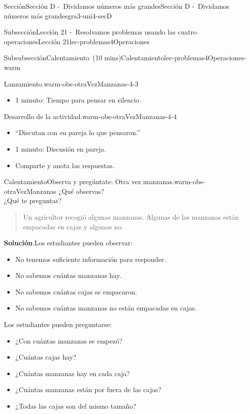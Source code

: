 \documentclass[oneside,10pt,]{article}
\newcommand{\blocktitlefont}{\relax}
\begin{document}
\begin{sectionptx}{Sección}{Sección D -~Dividamos números más grandes}{}{Sección D -~Dividamos números más grandes}{}{}{gra3-uni4-secD}
\begin{subsectionptx}{Subsección}{Lección 21 -~Resolvamos problemas usando las cuatro operaciones}{}{Lección 21}{}{}{lec-problemas4Operaciones}
\begin{subsubsectionptx}{Subsubsección}{Calentamiento~(10 mins)}{}{Calentamiento}{}{}{lec-problemas4Operaciones-warm}
\begin{paragraphs}{Lanzamiento.}{warm-obs-otraVezManzanas-4-3}
\begin{itemize}[label=\textbullet]
\item{}1 minuto: Tiempo para pensar en silencio.%
\end{itemize}
\end{paragraphs}%
\begin{paragraphs}{Desarrollo de la actividad.}{warm-obs-otraVezManzanas-4-4}%
%
\begin{itemize}[label=\textbullet]
\item{}``Discutan con su pareja lo que pensaron.''%
\item{}1 minuto: Discusión en pareja.%
\item{}Comparte y anota las respuestas.%
\end{itemize}
\end{paragraphs}%
\begin{exploration}{Calentamiento}{Observa y pregúntate: Otra vez manzanas.}{warm-obs-otraVezManzanas}%
¿Qué observas?\\
 ¿Qué te preguntas?%
\begin{quote}%
Un agricultor recogió algunas manzanas. Algunas de las manzanas están empacadas en cajas y algunas no.%
\end{quote}
\par\smallskip%
\noindent\textbf{\blocktitlefont Solución}.\hypertarget{warm-obs-otraVezManzanas-3}{}\quad{}Los estudiantes pueden observar:%
%
\begin{itemize}[label=\textbullet]
\item{}No tenemos suficiente información para responder.%
\item{}No sabemos cuántas manzanas hay.%
\item{}No sabemos cuántas cajas se empacaron.%
\item{}No sabemos cuántas manzanas no están empacadas en cajas.%
\end{itemize}
%
\par
Los estudiantes pueden preguntarse:%
%
\begin{itemize}[label=\textbullet]
\item{}¿Con cuántas manzanas se empezó?%
\item{}¿Cuántas cajas hay?%
\item{}¿Cuántas manzanas hay en cada caja?%
\item{}¿Cuántas manzanas están por fuera de las cajas?%
\item{}¿Todas las cajas son del mismo tamaño?%
\end{itemize}
%
\end{exploration}%
\par

\end{subsubsectionptx}
\end{subsectionptx}
\end{sectionptx}
\end{document}
